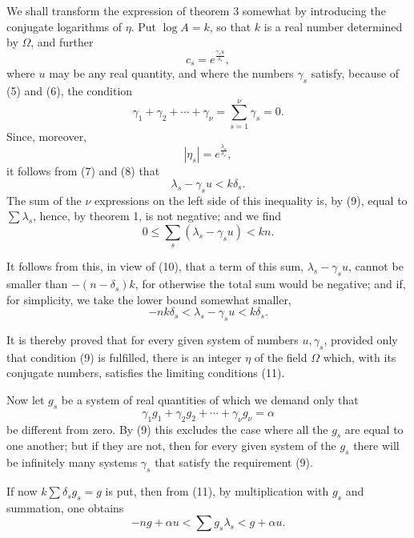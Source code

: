 \documentclass[11pt]{article}
\begin{document}
We shall transform the expression of theorem 3 somewhat by introducing the conjugate logarithms of $\eta$. Put $\log A=k$, so that $k$ is a real number determined by $\Omega$, and further
\begin{equation}
c_s=e^{\frac{\gamma_su}{\delta_s}},
\tag{8}
\end{equation}
where $u$ may be any real quantity, and where the numbers $\gamma_s$ satisfy, because of (5) and (6), the condition
\begin{equation}
\gamma_1+\gamma_2+\cdots+\gamma_\nu=\sum_{s=1}^{\nu}\gamma_s=0.
\tag{9}
\end{equation}
Since, moreover,
\[
|\eta_s|=e^{\frac{\lambda_s}{\delta_s}},
\]
it follows from (7) and (8) that
\begin{equation}
\lambda_s-\gamma_su<k\delta_s.
\tag{10}
\end{equation}
The sum of the $\nu$ expressions on the left side of this inequality is, by (9), equal to $\sum\lambda_s$, hence, by theorem 1, is not negative; and we find
\[
0\leq \sum_s(\lambda_s-\gamma_su)<kn.
\]

It follows from this, in view of (10), that a term of this sum, $\lambda_s-\gamma_su$, cannot be smaller than $-(n-\delta_s)k$, for otherwise the total sum would be negative; and if, for simplicity, we take the lower bound somewhat smaller,
\begin{equation}
-nk\delta_s<\lambda_s-\gamma_su<k\delta_s.
\tag{11}
\end{equation}

It is thereby proved that for every given system of numbers $u,\gamma_s$, provided only that condition (9) is fulfilled, there is an integer $\eta$ of the field $\Omega$ which, with its conjugate numbers, satisfies the limiting conditions (11).

Now let $g_s$ be a system of real quantities of which we demand only that
\[
\gamma_1g_1+\gamma_2g_2+\cdots+\gamma_\nu g_\nu=\alpha
\]
be different from zero. By (9) this excludes the case where all the $g_s$ are equal to one another; but if they are not, then for every given system of the $g_s$ there will be infinitely many systems $\gamma_s$ that satisfy the requirement (9).

If now $k\sum\delta_sg_s=g$ is put, then from (11), by multiplication with $g_s$ and summation, one obtains
\begin{equation}
-ng+\alpha u<\sum g_s\lambda_s<g+\alpha u.
\tag{12}
\end{equation}
\end{document}
